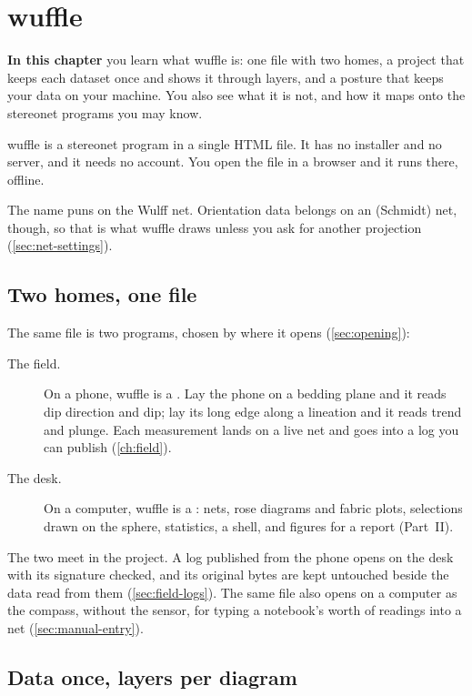 \chapter{wuffle}\label{ch:wuffle}
\begin{goals}
\textbf{In this chapter} you learn what wuffle is: one file with two homes, a project that keeps each
dataset once and shows it through layers, and a posture that keeps your data on your machine. You also
see what it is not, and how it maps onto the stereonet programs you may know.
\end{goals}

wuffle is a stereonet program in a single HTML file. It has no installer and no server, and it needs no
account. You open the file in a browser and it runs there, offline.

The name puns on the Wulff net. Orientation data belongs on an 
(Schmidt) net, though, so that is what wuffle draws unless you ask for another projection
(\cref{sec:net-settings}).

\section{Two homes, one file}\label{sec:two-homes}

The same file is two programs, chosen by where it opens (\cref{sec:opening}):

\begin{description}
\item[The field.] On a phone, wuffle is a . Lay the phone on a
bedding plane and it reads dip direction and dip; lay its long edge along a lineation and it reads trend
and plunge. Each measurement lands on a live net and goes into a log you can publish (\cref{ch:field}).
\item[The desk.] On a computer, wuffle is a : nets, rose diagrams and fabric plots,
selections drawn on the sphere, statistics, a shell, and figures for a report (Part~II).
\end{description}

The two meet in the project. A log published from the phone opens on the desk with its signature
checked, and its original bytes are kept untouched beside the data read from them
(\cref{sec:field-logs}). The same file also opens on a computer as the compass, without the sensor, for
typing a notebook's worth of readings into a net (\cref{sec:manual-entry}).

\section{Data once, layers per diagram}\label{sec:data-once}

